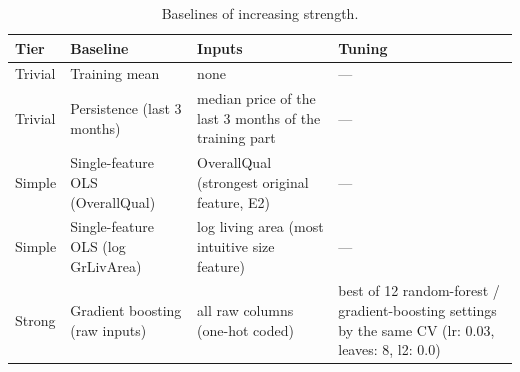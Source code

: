 \begin{table}[t]
\centering
\small
\begin{tabular}{llll}
\toprule
Tier & Baseline & Inputs & Tuning \\
\midrule
Trivial & Training mean & none & — \\
Trivial & Persistence (last 3 months) & median price of the last 3 months of the training part & — \\
Simple & Single-feature OLS (OverallQual) & OverallQual (strongest original feature, E2) & — \\
Simple & Single-feature OLS (log GrLivArea) & log living area (most intuitive size feature) & — \\
Strong & Gradient boosting (raw inputs) & all raw columns (one-hot coded) & best of 12 random-forest / gradient-boosting settings by the same CV (lr: 0.03, leaves: 8, l2: 0.0) \\
\bottomrule
\end{tabular}
\caption{Baselines of increasing strength.}
\label{tab:baselines}
\end{table}
